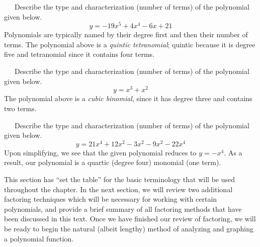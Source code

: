 \begin{example}~~~Describe the type and characterization (number of terms) of the polynomial given below.
$$y = -19x^5+4x^4-6x+21$$
Polynomials are typically named by their degree first and then their number of terms.  The polynomial above is a \textit{quintic tetranomial}; quintic because it is degree five and tetranomial since it contains four terms.
\end{example}

\begin{example}~~~Describe the type and characterization (number of terms) of the polynomial given below.
$$y = x^3+x^2$$
The polynomial above is a \textit{cubic binomial}, since it has degree three and contains two terms. 
\end{example}

\begin{example}~~~Describe the type and characterization (number of terms) of the polynomial given below.
$$y = 21x^4+12x^2-3x^2-9x^2-22x^4$$
Upon simplifying, we see that the given polynomial reduces to $y=-x^4$.  As a result, our polynomial is a quartic (degree four) monomial (one term).
\end{example}
This section has ``set the table'' for the basic terminology that will be used throughout the chapter.  In the next section, we will review two additional factoring techniques which will be necessary for working with certain polynomials, and provide a brief summary of all factoring methods that have been discussed in this text.  Once we have finished our review of factoring, we will be ready to begin the natural (albeit lengthy) method of analyzing and graphing a polynomial function. 
